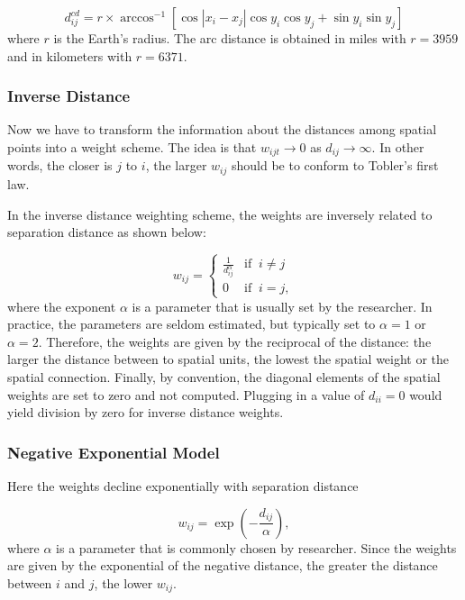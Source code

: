 \documentclass[english,12pt]{book}\usepackage[]{graphicx}\usepackage[]{xcolor}
\begin{document}
\begin{equation*}
d_{ij}^{cd} = r \times \arccos^{-1}\left[\cos|x_i - x_j| \cos y_i \cos y_j + \sin y_i \sin y_j \right]
\end{equation*}
%
where $r$ is the Earth's radius. The arc distance is obtained in miles with $r = 3959$ and in kilometers with $r = 6371$.

\subsubsection{Inverse Distance}\label{sec:inverse_distance}

Now we have to transform the information about the distances among spatial points into a weight scheme. The idea is that $w_{ijt}\to 0$ as $d_{ij}\to \infty$. In other words, the closer is $j$ to $i$, the larger $w_{ij}$ should be to conform to Tobler's first law. 

In the inverse distance weighting scheme, the weights are inversely related to separation distance as shown below:

\begin{equation*}
  w_{ij} =
  \begin{cases}
  \frac{1}{d_{ij}^{\alpha}} & \mbox{if} \;\;i \neq j \\
  0 & \mbox{if}\;\; i = j,
  \end{cases}
\end{equation*}
%
where the exponent $\alpha$ is a parameter that is usually set by the researcher. In practice, the parameters are seldom estimated, but typically set to $\alpha = 1$ or $\alpha = 2$. Therefore, the weights are given by  the reciprocal of the distance: the larger the distance between to spatial units, the lowest the spatial weight or the spatial connection. Finally, by convention, the diagonal elements of the spatial weights are set to zero and not computed. Plugging in a value of $d_{ii} = 0$ would yield division by zero for inverse distance weights. 

\subsubsection{Negative Exponential Model}

Here the weights decline exponentially with separation distance

\begin{equation*}
  w_{ij} = \exp\left(-\frac{d_{ij}}{\alpha}\right),
\end{equation*}
%
where $\alpha$ is a parameter that is commonly chosen by researcher. Since the weights are given by the exponential of the negative distance, the greater the distance between $i$ and $j$, the lower $w_{ij}$.
\end{document}
